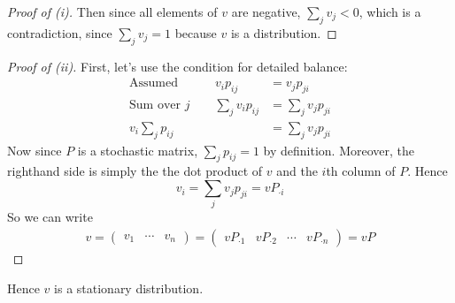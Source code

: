 \documentclass[12pt]{article}
\theoremstyle{plain}
\theoremstyle{definition}
\theoremstyle{remark}
\begin{document}
\begin{enumerate}
\begin{proof}[Proof of (i)]
  Then since all elements of $v$ are negative, $\sum_j v_j < 0$, which
  is a contradiction, since $\sum_j v_j = 1$ because $v$ is a
  distribution.
  \end{proof}

  \begin{proof}[Proof of (ii)] First, let's use the condition for
    detailed balance:
    \begin{align*}
      \text{Assumed} \qquad \quad v_i p_{ij} &= v_j p_{ji} \\
      \text{Sum over $j$} \qquad \sum_j v_i p_{ij} &= \sum_j v_j p_{ji} \\
       v_i\sum_j  p_{ij} &= \sum_j v_j p_{ji}
    \end{align*}
    Now since $P$ is a stochastic matrix, $\sum_j p_{ij}=1$ by
    definition. Moreover, the righthand side is simply the the dot
    product of $v$ and the $i$th column of $P$.  Hence
    \begin{equation}
      \label{q2.vi}
      v_i = \sum_j v_j p_{ji} = v P_{\cdot i}
    \end{equation}
    So we can write
    \begin{align*}
      v =
      \begin{pmatrix}
        v_1 & \cdots & v_n
      \end{pmatrix} =
      \begin{pmatrix}
        v P_{\cdot 1} & v P_{\cdot 2} & \cdots & v P_{\cdot n}
      \end{pmatrix}
        = vP
    \end{align*}
  \end{proof}
  Hence $v$ is a stationary distribution.


\end{enumerate}
\end{document}

